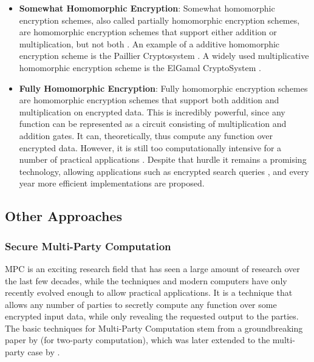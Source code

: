\begin{itemize}
    \item \textbf{Somewhat Homomorphic Encryption}: Somewhat homomorphic encryption schemes, also called partially homomorphic encryption schemes, are homomorphic encryption schemes that support either addition or multiplication, but not both \citep{she}. An example of a additive homomorphic encryption scheme is the Paillier Cryptosystem \citep{paillier}. A widely used multiplicative homomorphic encryption scheme is the ElGamal CryptoSystem \citep{elgamal}.
    \item \textbf{Fully Homomorphic Encryption}: Fully homomorphic encryption schemes are homomorphic encryption schemes that support both addition and multiplication on encrypted data. This is incredibly powerful, since any function can be represented as a circuit consisting of multiplication and addition gates. It can, theoretically, thus compute any function over encrypted data. However, it is still too computationally intensive for a number of practical applications \citep{he-practical, pragmatic-mpc}. Despite that hurdle it remains a promising technology, allowing applications such as encrypted search queries \citep{fhe}, and every year more efficient implementations are proposed.
\end{itemize}
\subsection{Other Approaches}
\subsubsection{Secure Multi-Party Computation}
\label{sec:mpc}
\gls{MPC} is an exciting research field that has seen a large amount of research over the last few decades, while the techniques and modern computers have only recently evolved enough to allow practical applications. It is a technique that allows any number of parties to secretly compute any function over some encrypted input data, while only revealing the requested output to the parties. The basic techniques for Multi-Party Computation stem from a groundbreaking paper by \citet{yao} (for two-party computation), which was later extended to the multi-party case by \citet{mpc}.


